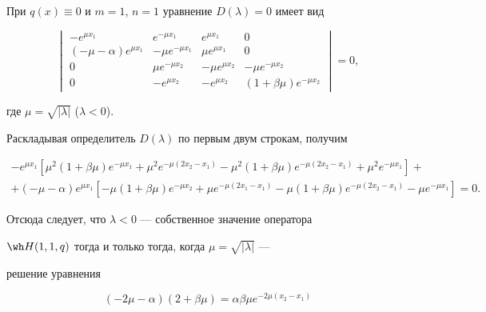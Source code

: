  


\begin{pf} 


При $q(x)\equiv 0$ и $m=1$, $n=1$ уравнение $D(\lambda)=0$ имеет вид 


$$ 


\begin{vmatrix} 


-e^{\mu x_1} & e^{-\mu x_1} & e^{\mu x_1} & 0 \\ 


(-\mu-\alpha)e^{\mu x_1} & -\mu e^{-\mu x_1} & \mu e^{\mu x_1} 


& 0 \\ 


0 & \mu e^{-\mu x_2} & -\mu e^{\mu x_2} & -\mu e^{-\mu x_2} \\ 


0 & -e^{\mu x_2} & -e^{\mu x_2} & (1+\beta\mu)e^{-\mu x_2} 


\end{vmatrix} 


=0, 


$$ 


где $\mu=\sqrt{|\lambda|}$ ($\lambda<0$). 


 


Раскладывая определитель $D(\lambda)$ по первым двум строкам, получим 


\begin{multline*} 


-e^{\mu x_1}[\mu^2(1+\beta\mu)e^{-\mu x_1}+ 


\mu^2e^{-\mu(2x_2-x_1)}-\mu^2(1+\beta\mu) 


e^{-\mu(2x_2-x_1)}+\mu^2e^{-\mu x_1}] + \\ 


+(-\mu-\alpha)e^{\mu x_1}[-\mu(1+\beta\mu)e^{-\mu x_2}+ 


\mu e^{-\mu(2x_1-x_1)}-\mu(1+\beta\mu)e^{-\mu(2x_2-x_1)}- 


\mu e^{-\mu x_1}]=0. 


\end{multline*} 


Отсюда следует, что $\lambda<0$ --- собственное значение оператора 


$\wh H(1,1,q)$ тогда и только тогда, когда $\mu=\sqrt{|\lambda|}$ --- 


решение уравнения 


\begin{equation} 


(-2\mu-\alpha)(2+\beta\mu)=\alpha\beta\mu e^{-2\mu(x_2-x_1)} 



\end{equation}
\end{pf}
